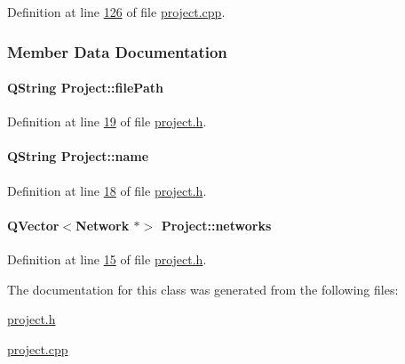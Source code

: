 Definition at line \hyperlink{project_8cpp_source_l00126}{126} of file \hyperlink{project_8cpp_source}{project.\+cpp}.



\subsubsection{Member Data Documentation}
\hypertarget{class_project_a79f30adcefd0b72bd4ac7db724bc9531}{}
\paragraph[{file\+Path}]{\setlength{\rightskip}{0pt plus 5cm}Q\+String Project\+::file\+Path}\label{class_project_a79f30adcefd0b72bd4ac7db724bc9531}


Definition at line \hyperlink{project_8h_source_l00019}{19} of file \hyperlink{project_8h_source}{project.\+h}.

\hypertarget{class_project_a82dd2d1bc38f9fd08c9a811fcaa76b38}{}
\paragraph[{name}]{\setlength{\rightskip}{0pt plus 5cm}Q\+String Project\+::name}\label{class_project_a82dd2d1bc38f9fd08c9a811fcaa76b38}


Definition at line \hyperlink{project_8h_source_l00018}{18} of file \hyperlink{project_8h_source}{project.\+h}.

\hypertarget{class_project_a28c99cc1f0568fbc6f2428894acf3c3a}{}
\paragraph[{networks}]{\setlength{\rightskip}{0pt plus 5cm}Q\+Vector$<${\bf Network} $\ast$$>$ Project\+::networks}\label{class_project_a28c99cc1f0568fbc6f2428894acf3c3a}


Definition at line \hyperlink{project_8h_source_l00015}{15} of file \hyperlink{project_8h_source}{project.\+h}.



The documentation for this class was generated from the following files\+:\begin{DoxyCompactItemize}
\item 
\hyperlink{project_8h}{project.\+h}\item 
\hyperlink{project_8cpp}{project.\+cpp}\end{DoxyCompactItemize}
